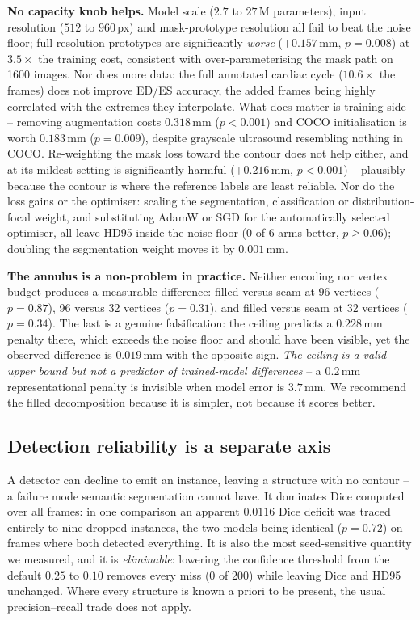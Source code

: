 \textbf{No capacity knob helps.} Model scale ($2.7$ to $27$\,M parameters),
input resolution ($512$ to $960$\,px) and mask-prototype resolution all fail to
beat the noise floor; full-resolution prototypes are significantly \emph{worse}
($+0.157$\,mm, $p{=}0.008$) at $3.5\times$ the training cost, consistent with
over-parameterising the mask path on 1600 images. Nor does more data: the full
annotated cardiac cycle ($10.6\times$ the frames) does not improve ED/ES
accuracy, the added frames being highly correlated with the extremes they
interpolate. What does matter is training-side -- removing augmentation costs
$0.318$\,mm ($p{<}0.001$) and COCO initialisation is worth $0.183$\,mm
($p{=}0.009$), despite grayscale ultrasound resembling nothing in COCO.
Re-weighting the mask loss toward the contour does not help either, and at its
mildest setting is significantly harmful ($+0.216$\,mm, $p{<}0.001$) --
plausibly because the contour is where the reference labels are least reliable.
Nor do the loss gains or the optimiser: scaling the segmentation, classification
or distribution-focal weight, and substituting AdamW or SGD for the
automatically selected optimiser, all leave HD95 inside the noise floor (0 of 6
arms better, $p{\geq}0.06$); doubling the segmentation weight moves it by
$0.001$\,mm.



\textbf{The annulus is a non-problem in practice.} Neither encoding nor vertex
budget produces a measurable difference: filled versus seam at 96 vertices
($p{=}0.87$), 96 versus 32 vertices ($p{=}0.31$), and filled versus seam at 32
vertices ($p{=}0.34$). The last is a genuine falsification: the ceiling predicts
a $0.228$\,mm penalty there, which exceeds the noise floor and should have been
visible, yet the observed difference is $0.019$\,mm with the opposite sign.
\emph{The ceiling is a valid upper bound but not a predictor of trained-model
differences} -- a $0.2$\,mm representational penalty is invisible when model
error is $3.7$\,mm. We recommend the filled decomposition because it is simpler,
not because it scores better.

\subsection{Detection reliability is a separate axis}

A detector can decline to emit an instance, leaving a structure with no contour
-- a failure mode semantic segmentation cannot have. It dominates Dice computed
over all frames: in one comparison an apparent $0.0116$ Dice deficit was traced
entirely to nine dropped instances, the two models being identical ($p{=}0.72$)
on frames where both detected everything. It is also the most seed-sensitive
quantity we measured, and it is \emph{eliminable}: lowering the confidence
threshold from the default $0.25$ to $0.10$ removes every miss (0 of 200) while
leaving Dice and HD95 unchanged. Where every structure is known a priori to be
present, the usual precision--recall trade does not apply.
